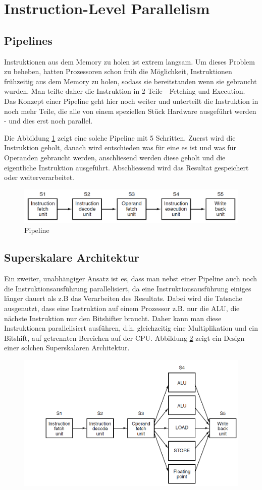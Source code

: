 \section{Instruction-Level Parallelism}
\subsection{Pipelines}
Instruktionen aus dem Memory zu holen ist extrem langsam. Um dieses Problem zu beheben, hatten Prozessoren schon früh die Möglichkeit, Instruktionen frühzeitig aus dem Memory zu holen, sodass sie bereitstanden wenn sie gebraucht wurden.
Man teilte daher die Instruktion in 2 Teile - Fetching und Execution. Das Konzept einer Pipeline geht hier noch weiter und unterteilt die Instruktion in noch mehr Teile, die alle von einem speziellen Stück Hardware ausgeführt werden - und dies erst noch parallel.

Die Abbildung \ref{fig:pipeline} zeigt eine solche Pipeline mit 5 Schritten. Zuerst wird die Instruktion geholt, danach wird entschieden was für eine es ist und was für Operanden gebraucht werden, anschliesend werden diese geholt und die eigentliche Instruktion ausgeführt. Abschliessend wird das Resultat gespeichert oder weiterverarbeitet.
\begin{figure}
	\centering
	\includegraphics[width=0.7\linewidth]{fig/pipeline}
	\caption{Pipeline}
	\label{fig:pipeline}
\end{figure}

\subsection{Superskalare Architektur}
Ein zweiter, unabhängiger Ansatz ist es, dass man nebst einer Pipeline auch noch die Instruktionsausführung parallelisiert, da eine Instruktionsausführung einiges länger dauert als z.B das Verarbeiten des Resultats. Dabei wird die Tatsache ausgenutzt, dass eine Instruktion auf einem Prozessor z.B. nur die ALU, die nächste Instruktion nur den Bitshifter braucht. Daher kann man diese Instruktionen parallelisiert ausführen, d.h. gleichzeitig eine Multiplikation und ein Bitshift, auf getrennten Bereichen auf der CPU. Abbildung \ref{fig:superskalar} zeigt ein Design einer solchen Superskalaren Architektur.
\begin{figure}
\centering
\includegraphics[width=0.7\linewidth]{fig/superskalar}
\caption{}
\label{fig:superskalar}
\end{figure}

